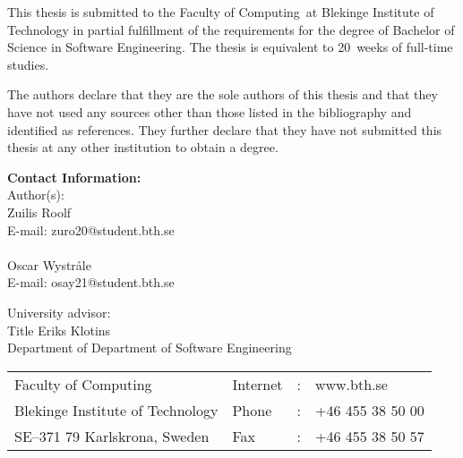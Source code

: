 \documentclass[a4paper,twoside]{bth}
\makeatletter
\newcommand{\thesisDegree}{Bachelor of Science in Software Engineering}
\newcommand{\faculty}{Computing}
\newcommand{\thesisWeeks}{20}
\newcommand{\authorFirst}{Zuilis Roolf}
\newcommand{\authorFirstMail}{zuro20@student.bth.se}
\newcommand{\authorSecond}{Oscar Wystråle}
\newcommand{\authorSecondMail}{osay21@student.bth.se}
\newcommand{\super}{Title Eriks Klotins}
\newcommand{\superAffiliation}{Department of Software Engineering}
\makeatother
\begin{document}
{\pagestyle{empty}
\changepage{3cm}{1cm}{-0.5cm}{-0.5cm}{}{-1.5cm}{}{}{}

{\small
\noindent
This thesis is submitted to the Faculty of \faculty\ at Blekinge Institute
of Technology in partial fulfillment of the requirements for the degree of
\thesisDegree. The thesis is equivalent to \thesisWeeks\ weeks of full-time studies.

\vspace{1cm}

\noindent
The authors declare that they are the sole authors of this thesis and that they have
not used any sources other than those listed in the bibliography and identified as references.
They further declare that they have not submitted this thesis at any other institution to
obtain a degree.
}

\vspace{10cm}

\noindent
\textbf{Contact Information:} \\
Author(s): \\
\authorFirst \\
E-mail: \authorFirstMail \\
\\
\authorSecond \\
E-mail: \authorSecondMail

\vspace{2cm}

\noindent
University advisor: \\
\super \\
Department of \superAffiliation

\vspace*{\fill}

\noindent
\begin{tabular}{@{}p{} l c l}
Faculty of \faculty              & Internet & : & www.bth.se \\
Blekinge Institute of Technology & Phone    & : & +46 455 38 50 00 \\
SE--371 79 Karlskrona, Sweden    & Fax      & : & +46 455 38 50 57 \\
\end{tabular}
\clearpage
} %

\setcounter{page}{1}

\end{document}
